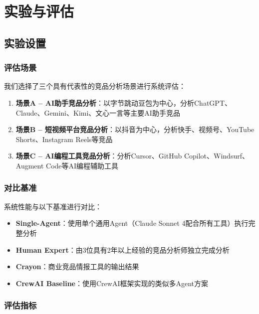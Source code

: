 \documentclass[12pt,a4paper]{ctexrep}
\begin{document}
\chapter{实验与评估}

\section{实验设置}

\subsection{评估场景}

我们选择了三个具有代表性的竞品分析场景进行系统评估：

\begin{enumerate}[leftmargin=2em]
\item \textbf{场景A -- AI助手竞品分析}：以字节跳动豆包为中心，分析ChatGPT、Claude、Gemini、Kimi、文心一言等主要AI助手竞品
\item \textbf{场景B -- 短视频平台竞品分析}：以抖音为中心，分析快手、视频号、YouTube Shorts、Instagram Reels等竞品
\item \textbf{场景C -- AI编程工具竞品分析}：分析Cursor、GitHub Copilot、Windsurf、Augment Code等AI编程辅助工具
\end{enumerate}

\subsection{对比基准}

系统性能与以下基准进行对比：

\begin{itemize}[leftmargin=2em]
\item \textbf{Single-Agent}：使用单个通用Agent（Claude Sonnet 4配合所有工具）执行完整分析
\item \textbf{Human Expert}：由3位具有2年以上经验的竞品分析师独立完成分析
\item \textbf{Crayon}：商业竞品情报工具的输出结果
\item \textbf{CrewAI Baseline}：使用CrewAI框架实现的类似多Agent方案
\end{itemize}

\subsection{评估指标}
\end{document}
